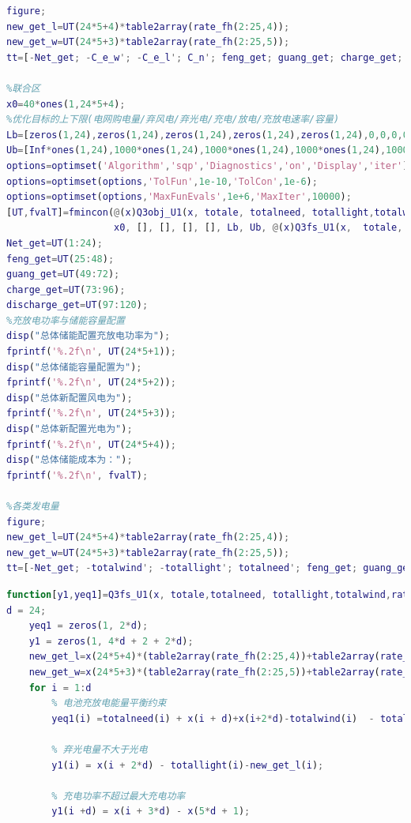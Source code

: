 \documentclass{cumcmthesis}
\begin{document}
\begin{appendices}
\begin{lstlisting}[language=Matlab]
%各类发电量
figure;
new_get_l=UT(24*5+4)*table2array(rate_fh(2:25,4));
new_get_w=UT(24*5+3)*table2array(rate_fh(2:25,5));
tt=[-Net_get; -C_e_w'; -C_e_l'; C_n'; feng_get; guang_get; charge_get; -discharge_get;-new_get_w';-new_get_l'];

%联合区
x0=40*ones(1,24*5+4);
%优化目标的上下限(电网购电量/弃风电/弃光电/充电/放电/充放电速率/容量)
Lb=[zeros(1,24),zeros(1,24),zeros(1,24),zeros(1,24),zeros(1,24),0,0,0,0];
Ub=[Inf*ones(1,24),1000*ones(1,24),1000*ones(1,24),1000*ones(1,24),1000*ones(1,24),1000,3000,1000,1000];
options=optimset('Algorithm','sqp','Diagnostics','on','Display','iter');
options=optimset(options,'TolFun',1e-10,'TolCon',1e-6);
options=optimset(options,'MaxFunEvals',1e+6,'MaxIter',10000);
[UT,fvalT]=fmincon(@(x)Q3obj_U1(x, totale, totalneed, totallight,totalwind), ...
                   x0, [], [], [], [], Lb, Ub, @(x)Q3fs_U1(x,  totale, totalneed, totallight,totalwind,rate_fh), options);
Net_get=UT(1:24);
feng_get=UT(25:48);
guang_get=UT(49:72);
charge_get=UT(73:96);
discharge_get=UT(97:120);
%充放电功率与储能容量配置
disp("总体储能配置充放电功率为");
fprintf('%.2f\n', UT(24*5+1));
disp("总体储能容量配置为");
fprintf('%.2f\n', UT(24*5+2));
disp("总体新配置风电为");
fprintf('%.2f\n', UT(24*5+3));
disp("总体新配置光电为");
fprintf('%.2f\n', UT(24*5+4));
disp("总体储能成本为：");
fprintf('%.2f\n', fvalT);

%各类发电量
figure;
new_get_l=UT(24*5+4)*table2array(rate_fh(2:25,4));
new_get_w=UT(24*5+3)*table2array(rate_fh(2:25,5));
tt=[-Net_get; -totalwind'; -totallight'; totalneed'; feng_get; guang_get; charge_get; -discharge_get;-new_get_w';-new_get_l'];
\end{lstlisting}

\begin{lstlisting}[language=Matlab]
function[y1,yeq1]=Q3fs_U1(x, totale,totalneed, totallight,totalwind,rate_fh)
d = 24;
    yeq1 = zeros(1, 2*d);
    y1 = zeros(1, 4*d + 2 + 2*d);
    new_get_l=x(24*5+4)*(table2array(rate_fh(2:25,4))+table2array(rate_fh(2:25,2)))/2;
    new_get_w=x(24*5+3)*(table2array(rate_fh(2:25,5))+table2array(rate_fh(2:25,3)))/2;
    for i = 1:d
        % 电池充放电能量平衡约束
        yeq1(i) =totalneed(i) + x(i + d)+x(i+2*d)-totalwind(i)  - totallight(i) + x(i + 3*d) - x(i) - x(i + 4*d)-new_get_w(i)-new_get_l(i);
        
        % 弃光电量不大于光电
        y1(i) = x(i + 2*d) - totallight(i)-new_get_l(i);
        
        % 充电功率不超过最大充电功率
        y1(i +d) = x(i + 3*d) - x(5*d + 1);
        

\end{lstlisting}
\end{appendices}
\end{document}
